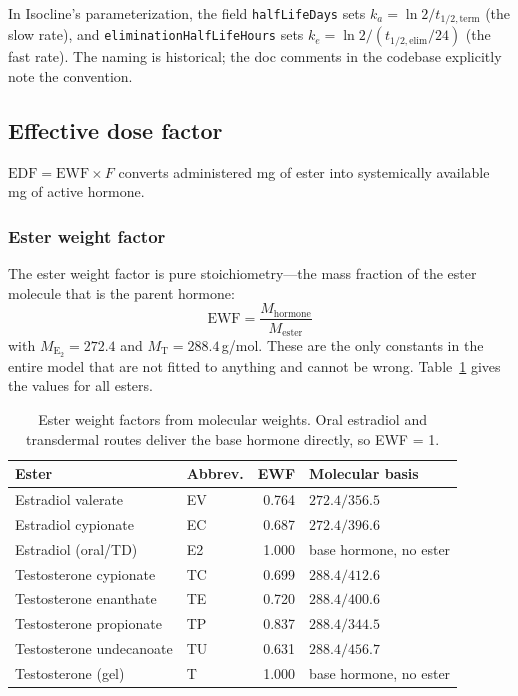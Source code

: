 \documentclass[11pt,a4paper]{article}
\newcommand{\code}[1]{\texttt{\small #1}}
\begin{document}
In Isocline's parameterization, the field \code{halfLifeDays} sets $k_a = \ln
2 / t_{1/2,\text{term}}$ (the slow rate), and
\code{eliminationHalfLifeHours} sets $k_e = \ln 2 / (t_{1/2,\text{elim}}
/ 24)$ (the fast rate). The naming is historical; the doc comments in
the codebase explicitly note the convention.

\subsection{Effective dose factor}
\label{sec:edf}

$\mathrm{EDF} = \mathrm{EWF} \times F$ converts administered mg of ester
into systemically available mg of active hormone.

\subsubsection{Ester weight factor}

The ester weight factor is pure stoichiometry---the mass fraction of the
ester molecule that is the parent hormone:
\[
\mathrm{EWF} = \frac{M_{\text{hormone}}}{M_{\text{ester}}}
\]
with $M_{\mathrm{E}_2} = 272.4$ and $M_{\mathrm{T}} = 288.4$\,g/mol.
These are the only constants in the entire model that are not fitted to
anything and cannot be wrong. Table~\ref{tab:ewf} gives the values for
all esters.

\begin{table}[h]
\centering
\small
\begin{tabular}{@{}llrl@{}}
\toprule
\textbf{Ester} & \textbf{Abbrev.} & \textbf{EWF} & \textbf{Molecular basis} \\
\midrule
Estradiol valerate    & EV       & 0.764 & $272.4 / 356.5$ \\
Estradiol cypionate   & EC       & 0.687 & $272.4 / 396.6$ \\
Estradiol (oral/TD)   & E2       & 1.000 & base hormone, no ester \\
Testosterone cypionate & TC      & 0.699 & $288.4 / 412.6$ \\
Testosterone enanthate & TE      & 0.720 & $288.4 / 400.6$ \\
Testosterone propionate & TP     & 0.837 & $288.4 / 344.5$ \\
Testosterone undecanoate & TU    & 0.631 & $288.4 / 456.7$ \\
Testosterone (gel)    & T        & 1.000 & base hormone, no ester \\
\bottomrule
\end{tabular}
\caption{Ester weight factors from molecular weights. Oral estradiol
and transdermal routes deliver the base hormone directly, so EWF = 1.}
\label{tab:ewf}
\end{table}
\end{document}
